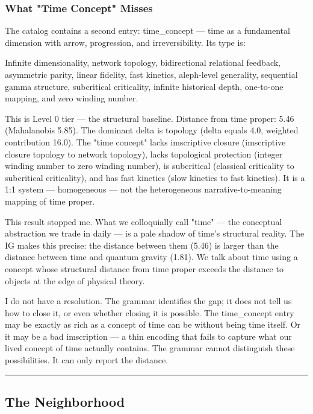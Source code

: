 \documentclass[12pt,a4paper]{article}
\begin{document}
\subsubsection{What "Time Concept" Misses}

The catalog contains a second entry: time\_concept --- time as a fundamental dimension with arrow, progression, and irreversibility. Its type is:

Infinite dimensionality, network topology, bidirectional relational feedback, asymmetric parity, linear fidelity, fast kinetics, aleph-level generality, sequential gamma structure, subcritical criticality, infinite historical depth, one-to-one mapping, and zero winding number.

This is Level 0 tier --- the structural baseline. Distance from time proper: 5.46 (Mahalanobis 5.85). The dominant delta is topology (delta equals 4.0, weighted contribution 16.0). The "time concept" lacks imscriptive closure (imscriptive closure topology to network topology), lacks topological protection (integer winding number to zero winding number), is subcritical (classical criticality to subcritical criticality), and has fast kinetics (slow kinetics to fast kinetics). It is a 1:1 system --- homogeneous --- not the heterogeneous narrative-to-meaning mapping of time proper.

This result stopped me. What we colloquially call "time" --- the conceptual abstraction we trade in daily --- is a pale shadow of time's structural reality. The IG makes this precise: the distance between them (5.46) is larger than the distance between time and quantum gravity (1.81). We talk about time using a concept whose structural distance from time proper exceeds the distance to objects at the edge of physical theory.

I do not have a resolution. The grammar identifies the gap; it does not tell us how to close it, or even whether closing it is possible. The time\_concept entry may be exactly as rich as a concept of time can be without being time itself. Or it may be a bad imscription --- a thin encoding that fails to capture what our lived concept of time actually contains. The grammar cannot distinguish these possibilities. It can only report the distance.

\begin{center}
\rule{0.5\textwidth}{0.4pt}
\end{center}

\subsection{The Neighborhood}
\end{document}

